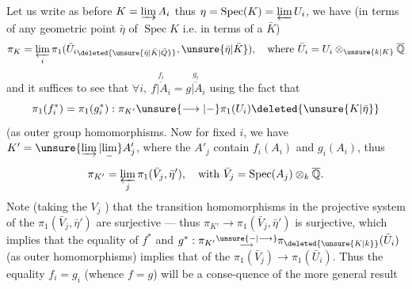 Let us write as before $K=\varinjlim A_i$ thus  $\eta=\operatorname{Spec}(K)=\varprojlim U_i$, we have (in terms of any geometric point $\bar\eta$ of $\operatorname{Spec}K$ i.e. in terms of a $\bar K$)
\[
\pi_K=\varprojlim_i\pi_1(\bar U_i{}_{\deleted{\unsure{\bar\eta|\bar K|\bar Q}}},\unsure{\bar\eta|\bar K}),\quad\text{where }\bar U_i=U_i\otimes_{\unsure{k|K}}\overline{\mathbb Q}
\]
and it suffices to see that $\forall i,\ \overset{f_i}{\overline{f|A_i}}=\overset{g_i}{\overline{g|A_i}}$  using the fact that
\[
\pi_1(f_i^*)=\pi_1(g_i^*):\pi_{K'}\unsure{\longrightarrow|-}\pi_1(U_i)\deleted{\unsure{K|\bar\eta}}
\]
(as outer group homomorphisms. Now for fixed $i$, we have $K'=\unsure{\varinjlim|\underset{-}{\lim}} A'_j$, where the $A'_j$ contain $f_i(A_i)$ and $g_i(A_i)$, thus
\[
\pi_{K'}=\varprojlim_j\pi_1(\bar V_j,\bar\eta'),\quad\text{with }\bar V_j=\operatorname{Spec}(A_j)\otimes_k\overline{\mathbb Q}.
\]
Note (taking the $V_j$ ) that the transition homomorphisms in the projective system of the $\pi_1(\bar V_j,\bar\eta')$ are surjective --- thus  $\pi_{K'}\longrightarrow\pi_1(\bar V_j,\bar\eta')$ is surjective, which implies that the equality of $f^*$ and $g^*:\pi_{K'}\substack{\unsure{-|\longrightarrow}\\\longrightarrow}\pi_{\deleted{\unsure{K|k}}}(\bar U_i)$ (as outer homomorphisms) implies that of the $\pi_1(\bar V_j)\longrightarrow\pi_1(\bar U_i)$.
Thus the equality $f_i=g_i$ (whence $f=g$) will be a conse-quence of the more general result\unsure{,|;}
